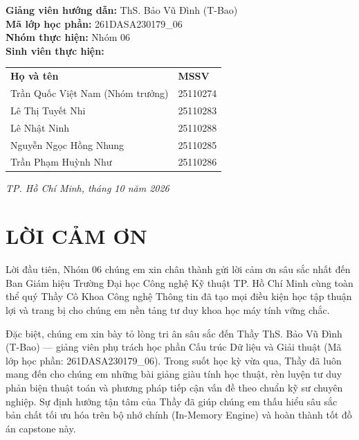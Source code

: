\documentclass[14pt,a4paper]{extarticle}
\begin{document}
\begin{titlepage}
    \fontsize{14pt}{17pt}\selectfont
    \begin{flushleft}
        \hspace{1.2cm}\textbf{Giảng viên hướng dẫn:} ThS. Bảo Vũ Đình (T-Bao)\\[0.15cm]
        \hspace{1.2cm}\textbf{Mã lớp học phần:} 261DASA230179\_06\\[0.15cm]
        \hspace{1.2cm}\textbf{Nhóm thực hiện:} Nhóm 06\\[0.15cm]
        \hspace{1.2cm}\textbf{Sinh viên thực hiện:}\\[0.1cm]
        \hspace{1.5cm}\begin{tabular}{ll}
            \textbf{Họ và tên} & \textbf{MSSV} \\
            Trần Quốc Việt Nam (Nhóm trưởng) & 25110274 \\
            Lê Thị Tuyết Nhi & 25110283 \\
            Lê Nhật Ninh & 25110288 \\
            Nguyễn Ngọc Hồng Nhung & 25110285 \\
            Trần Phạm Huỳnh Như & 25110286 \\
        \end{tabular}
    \end{flushleft}

    \vfill
    \fontsize{14pt}{17pt}\selectfont
    \textit{TP. Hồ Chí Minh, tháng 10 năm 2026}
\end{titlepage}

\newpage
\thispagestyle{empty}
\section*{LỜI CẢM ƠN}

Lời đầu tiên, Nhóm 06 chúng em xin chân thành gửi lời cảm ơn sâu sắc nhất đến Ban Giám hiệu Trường Đại học Công nghệ Kỹ thuật TP. Hồ Chí Minh cùng toàn thể quý Thầy Cô Khoa Công nghệ Thông tin đã tạo mọi điều kiện học tập thuận lợi và trang bị cho chúng em nền tảng tư duy khoa học máy tính vững chắc.

Đặc biệt, chúng em xin bày tỏ lòng tri ân sâu sắc đến Thầy ThS. Bảo Vũ Đình (T-Bao) --- giảng viên phụ trách học phần Cấu trúc Dữ liệu và Giải thuật (Mã lớp học phần: 261DASA230179\_06). Trong suốt học kỳ vừa qua, Thầy đã luôn mang đến cho chúng em những bài giảng giàu tính học thuật, rèn luyện tư duy phản biện thuật toán và phương pháp tiếp cận vấn đề theo chuẩn kỹ sư chuyên nghiệp. Sự định hướng tận tâm của Thầy đã giúp chúng em thấu hiểu sâu sắc bản chất tối ưu hóa trên bộ nhớ chính (In-Memory Engine) và hoàn thành tốt đồ án capstone này.
\end{document}
